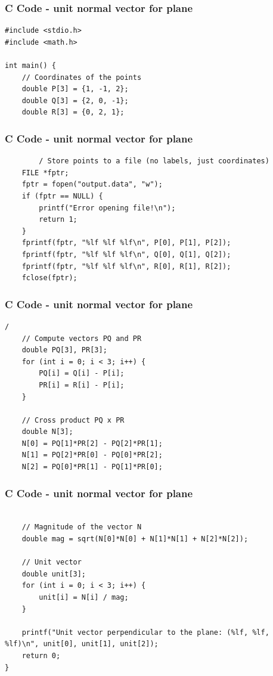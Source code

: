 \documentclass{beamer}
\begin{document}
\begin{frame}[fragile]
    \frametitle{C Code - unit normal vector for plane}

    \begin{lstlisting}
#include <stdio.h>
#include <math.h>

int main() {
    // Coordinates of the points
    double P[3] = {1, -1, 2};
    double Q[3] = {2, 0, -1};
    double R[3] = {0, 2, 1};
    \end{lstlisting}
\end{frame}
\begin{frame}[fragile]

    \frametitle{C Code - unit normal vector for plane}
    \begin{lstlisting}
        / Store points to a file (no labels, just coordinates)
    FILE *fptr;
    fptr = fopen("output.data", "w");
    if (fptr == NULL) {
        printf("Error opening file!\n");
        return 1;
    }
    fprintf(fptr, "%lf %lf %lf\n", P[0], P[1], P[2]);
    fprintf(fptr, "%lf %lf %lf\n", Q[0], Q[1], Q[2]);
    fprintf(fptr, "%lf %lf %lf\n", R[0], R[1], R[2]);
    fclose(fptr);
    \end{lstlisting}
\end{frame}
\begin{frame}[fragile]
    \frametitle{C Code - unit normal vector for plane}

    \begin{lstlisting}
/
    // Compute vectors PQ and PR
    double PQ[3], PR[3];
    for (int i = 0; i < 3; i++) {
        PQ[i] = Q[i] - P[i];
        PR[i] = R[i] - P[i];
    }

    // Cross product PQ x PR
    double N[3];
    N[0] = PQ[1]*PR[2] - PQ[2]*PR[1];
    N[1] = PQ[2]*PR[0] - PQ[0]*PR[2];
    N[2] = PQ[0]*PR[1] - PQ[1]*PR[0];

    \end{lstlisting}
\end{frame}
    \begin{frame}[fragile]
    \frametitle{C Code - unit normal vector for plane}

    \begin{lstlisting}

    // Magnitude of the vector N
    double mag = sqrt(N[0]*N[0] + N[1]*N[1] + N[2]*N[2]);

    // Unit vector
    double unit[3];
    for (int i = 0; i < 3; i++) {
        unit[i] = N[i] / mag;
    }

    printf("Unit vector perpendicular to the plane: (%lf, %lf, %lf)\n", unit[0], unit[1], unit[2]);
    return 0;
}
    \end{lstlisting}
\end{frame}
    
\end{document}
